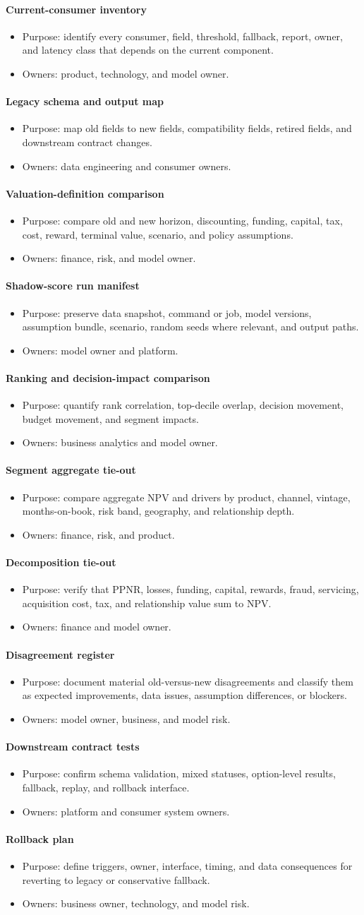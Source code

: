 \documentclass[11pt]{article}
\newcommand{\1}{\mathbf{1}}
\newcommand{\contractitem}[2]{\paragraph{#1}\begin{itemize}[leftmargin=1.5em,itemsep=0.12em,topsep=0.18em]#2\end{itemize}}
\begin{document}
\contractitem{Current-consumer inventory}{
  \item Purpose: identify every consumer, field, threshold, fallback, report,
        owner, and latency class that depends on the current component.
  \item Owners: product, technology, and model owner.
}
\contractitem{Legacy schema and output map}{
  \item Purpose: map old fields to new fields, compatibility fields, retired
        fields, and downstream contract changes.
  \item Owners: data engineering and consumer owners.
}
\contractitem{Valuation-definition comparison}{
  \item Purpose: compare old and new horizon, discounting, funding, capital,
        tax, cost, reward, terminal value, scenario, and policy assumptions.
  \item Owners: finance, risk, and model owner.
}
\contractitem{Shadow-score run manifest}{
  \item Purpose: preserve data snapshot, command or job, model versions,
        assumption bundle, scenario, random seeds where relevant, and output
        paths.
  \item Owners: model owner and platform.
}
\contractitem{Ranking and decision-impact comparison}{
  \item Purpose: quantify rank correlation, top-decile overlap, decision
        movement, budget movement, and segment impacts.
  \item Owners: business analytics and model owner.
}
\contractitem{Segment aggregate tie-out}{
  \item Purpose: compare aggregate NPV and drivers by product, channel,
        vintage, months-on-book, risk band, geography, and relationship depth.
  \item Owners: finance, risk, and product.
}
\contractitem{Decomposition tie-out}{
  \item Purpose: verify that PPNR, losses, funding, capital, rewards, fraud,
        servicing, acquisition cost, tax, and relationship value sum to NPV.
  \item Owners: finance and model owner.
}
\contractitem{Disagreement register}{
  \item Purpose: document material old-versus-new disagreements and classify
        them as expected improvements, data issues, assumption differences, or
        blockers.
  \item Owners: model owner, business, and model risk.
}
\contractitem{Downstream contract tests}{
  \item Purpose: confirm schema validation, mixed statuses, option-level
        results, fallback, replay, and rollback interface.
  \item Owners: platform and consumer system owners.
}
\contractitem{Rollback plan}{
  \item Purpose: define triggers, owner, interface, timing, and data
        consequences for reverting to legacy or conservative fallback.
  \item Owners: business owner, technology, and model risk.
}
\end{document}
